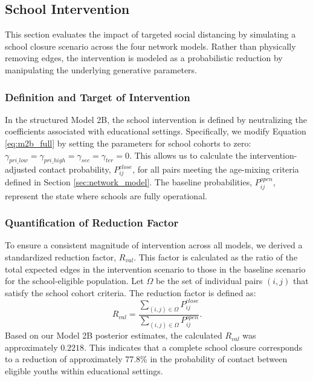 
\subsection{School Intervention}
This section evaluates the impact of targeted social distancing by simulating a school closure scenario across the four network models.
Rather than physically removing edges, the intervention is modeled as a probabilistic reduction by manipulating the underlying generative parameters.

\subsubsection{Definition and Target of Intervention}
In the structured Model 2B, the school intervention is defined by neutralizing the coefficients associated with educational settings.
Specifically, we modify Equation \ref{eq:m2b_full} by setting the parameters for school cohorts to zero: $\gamma_{pri\_low} = \gamma_{pri\_high} = \gamma_{sec} = \gamma_{ter} = 0$.
This allows us to calculate the intervention-adjusted contact probability, $P_{ij}^{close}$, for all pairs meeting the age-mixing criteria defined in Section \ref{sec:network_model}.
The baseline probabilities, $P_{ij}^{open}$, represent the state where schools are fully operational.

\subsubsection{Quantification of Reduction Factor}
To ensure a consistent magnitude of intervention across all models, we derived a standardized reduction factor, $R_{val}$.
This factor is calculated as the ratio of the total expected edges in the intervention scenario to those in the baseline scenario for the school-eligible population.
Let $\Omega$ be the set of individual pairs $(i, j)$ that satisfy the school cohort criteria.
The reduction factor is defined as:
\begin{equation}
    R_{val} = \frac{\sum_{(i,j) \in \Omega} P_{ij}^{close}}{\sum_{(i,j) \in \Omega} P_{ij}^{open}}.
\end{equation}
Based on our Model 2B posterior estimates, the calculated $R_{val}$ was approximately $0.2218$.
This indicates that a complete school closure corresponds to a reduction of approximately 77.8\% in the probability of contact between eligible youths within educational settings.

